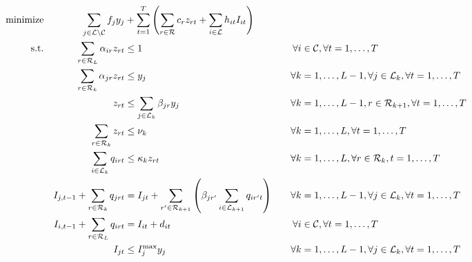 \documentclass[10pt, a4paper]{article}
\begin{document}
\begin{alignat}{3}
    \text{minimize} &&\sum_{j\in \loc \setminus \cu} f_{j} y_{j} &+\sum_{t=1}^{T} \left( \sum_{r\in \ro} c_r z_{rt} + \sum_{i\in \loc} h_{it} I_{it}\right)\label{objfunct}\\ 
    \text{s.t.}  %
    &&\sum_{r\in \ro_L} \alpha_{ir} z_{rt} &\leq 1 															&\forall i&\in \cu, \forall t=1,\ldots,T  \label{const:singleroutecustomers}\\
&&\sum_{r\in \ro_k} \alpha_{jr} z_{rt} &\leq y_j 															&\forall k&=1,\ldots,L-1, \forall j\in \loc_k, \forall t=1,\ldots,T  \label{const:singleroutedc}\\
&&z_{rt} 					&\leq \sum_{j\in\loc_{k}}\beta_{jr}y_j 													&\forall k&=1,\ldots,L-1,r\in \ro_{k+1}, \forall t=1,\ldots,T\label{const:startfromopendepots}\\
    &&\sum_{r\in \ro_k} z_{rt} &\leq 	\nu_k													&\forall k&=1,\ldots,L, \forall t=1,\ldots,T  \label{const:fleetcapa}\\
    &&\sum_{i\in \loc_k} q_{irt}   		&\leq \kappa_k z_{rt} 														&\forall k&=1,\ldots,L, \forall r\in \ro_k, t=1,\ldots,T\label{const:deliveryUB}\\
    &&I_{j,t-1} + \sum_{r\in\ro_k} q_{jrt}   			&=I_{jt} +\sum_{r'\in \ro_{k+1}}\left(\beta_{jr'} \sum_{i\in \loc_{k+1}}q_{ir't}\right)\quad 			&\forall k&=1,\ldots,L-1, \forall j\in \loc_k, \forall t=1,\ldots,T \label{const:invflowdepots}\\
    &&I_{i,t-1}+\sum_{r\in \ro_L} q_{irt} &= I_{it} +d_{it} 							&\forall i&\in \cu, \forall t=1,\ldots,T\label{const:invflowcustomers}\\
    &&I_{jt}					&\leq I_j^{\max} y_j  									&\forall k&=1,\ldots,L-1, \forall j\in \loc_k,\forall t=1,\ldots,T\label{const:invdepotUB}\\	

\end{alignat}
\end{document}

